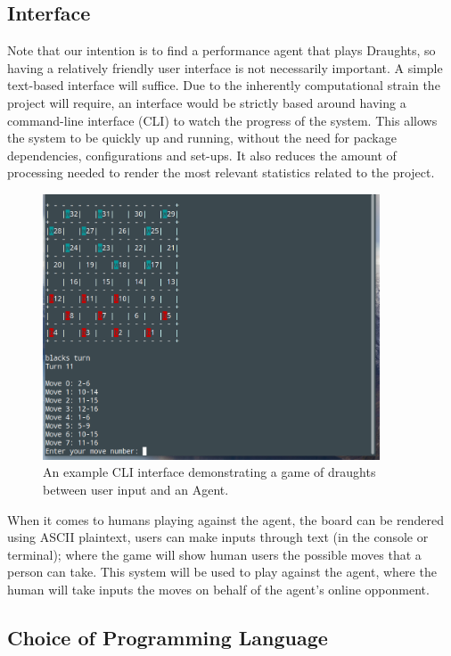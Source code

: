 \documentclass[12pt,a4paper]{article}
\begin{document}
\subsection*{Interface}

    Note that our intention is to find a performance agent that plays Draughts, so having a relatively friendly user interface is not necessarily important. A simple text-based interface will suffice. Due to the inherently computational strain the project will require, an interface would be strictly based around having a command-line interface (CLI) to watch the progress of the system. This allows the system to be quickly up and running, without the need for package dependencies, configurations and set-ups. It also reduces the amount of processing needed to render the most relevant statistics related to the project.

    \begin{figure}[ht!]
        \centering
        \includegraphics[width=100mm]{cli_humanvsagent.png}
        \caption{An example CLI interface demonstrating a game of draughts between user input and an Agent. \label{overflow2}}
    \end{figure}

    When it comes to humans playing against the agent, the board can be rendered using ASCII plaintext, users can make inputs through text (in the console or terminal); where the game will show human users the possible moves that a person can take. This system will be used to play against the agent, where the human will take inputs the moves on behalf of the agent's online opponment. 

\subsection*{Choice of Programming Language}
\end{document}
